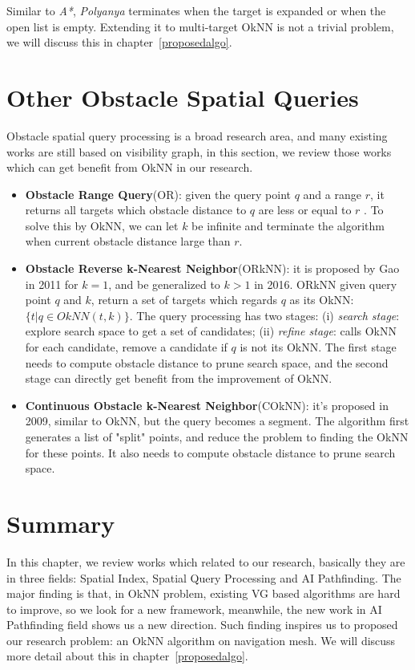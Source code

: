 Similar to \textit{A*}, \textit{Polyanya} terminates when the target is expanded or when the
open list is empty. Extending it to multi-target OkNN is not a trivial problem, we will discuss
this in chapter~\ref{proposedalgo}.

\section{Other Obstacle Spatial Queries}\label{lrquery}
Obstacle spatial query processing is a broad research area, and many existing works are still
based on visibility graph, in this section, we review those works which can get benefit from
OkNN in our research. 

\begin{itemize}

\item \textbf{Obstacle Range Query}(OR): given the query point $q$ and a range $r$,
  it returns all targets which obstacle distance to $q$ are less or equal to $r$ \cite{zhang2004spatial}. 
To solve this by OkNN, we can let $k$ be infinite and terminate the algorithm when current
obstacle distance large than $r$.

\item \textbf{Obstacle Reverse k-Nearest Neighbor}(ORkNN): it is proposed by Gao in
2011\cite{gao2011efficient} for $k=1$, and be generalized to $k>1$ in
2016\cite{gao2016reverse}. ORkNN given query point $q$ and $k$, return a set of targets which
regards $q$ as its OkNN: $\{t | q \in OkNN(t, k)\}$. The query processing has two stages:
(i) \textit{search stage}: explore search space to get a set of candidates; (ii) \textit{refine
stage}: calls OkNN for each candidate, remove a candidate if $q$ is not its OkNN.
The first stage needs to compute obstacle distance to prune search space, and the second stage 
can directly get benefit from the improvement of OkNN.

\item \textbf{Continuous Obstacle k-Nearest Neighbor}(COkNN): it's proposed in
  2009\cite{gao2009continuous}, similar to OkNN, but the query becomes a segment.
  The algorithm first generates a list of "split" points, and reduce the problem to finding the
    OkNN for these points. It also needs to compute obstacle distance to prune search space.

\end{itemize}

\section{Summary}
In this chapter, we review works which related to our research, basically they are in three
fields: Spatial Index, Spatial Query Processing and AI Pathfinding. The major finding is that,
in OkNN problem, existing VG based algorithms are hard to improve, so we look for a new
framework, meanwhile, the new work in AI Pathfinding field shows us a new direction.
Such finding inspires us to proposed our research problem: an OkNN algorithm on navigation mesh.
We will discuss more detail about this in chapter~\ref{proposedalgo}.
